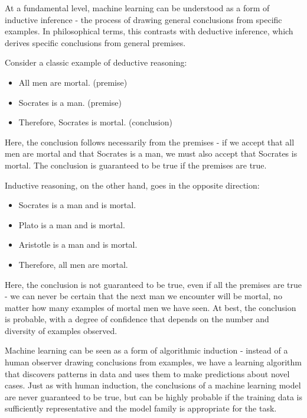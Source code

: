 \documentclass[
  9pt,
  letterpaper,
  abstract,
  titlepage]{scrbook}
\providecommand{\tightlist}{%
  \setlength{\itemsep}{0pt}\setlength{\parskip}{0pt}}\usepackage{longtable,booktabs,array}
\def\tightlist{}
\let\tightlist\relax
\begin{document}
At a fundamental level, machine learning can be understood as a form of
inductive inference - the process of drawing general conclusions from
specific examples. In philosophical terms, this contrasts with deductive
inference, which derives specific conclusions from general premises.

Consider a classic example of deductive reasoning:

\begin{itemize}
\tightlist
\item
  All men are mortal. (premise)
\item
  Socrates is a man. (premise)
\item
  Therefore, Socrates is mortal. (conclusion)
\end{itemize}

Here, the conclusion follows necessarily from the premises - if we
accept that all men are mortal and that Socrates is a man, we must also
accept that Socrates is mortal. The conclusion is guaranteed to be true
if the premises are true.

Inductive reasoning, on the other hand, goes in the opposite direction:

\begin{itemize}
\tightlist
\item
  Socrates is a man and is mortal.
\item
  Plato is a man and is mortal.
\item
  Aristotle is a man and is mortal.
\item
  Therefore, all men are mortal.
\end{itemize}

Here, the conclusion is not guaranteed to be true, even if all the
premises are true - we can never be certain that the next man we
encounter will be mortal, no matter how many examples of mortal men we
have seen. At best, the conclusion is probable, with a degree of
confidence that depends on the number and diversity of examples
observed.

Machine learning can be seen as a form of algorithmic induction -
instead of a human observer drawing conclusions from examples, we have a
learning algorithm that discovers patterns in data and uses them to make
predictions about novel cases. Just as with human induction, the
conclusions of a machine learning model are never guaranteed to be true,
but can be highly probable if the training data is sufficiently
representative and the model family is appropriate for the task.
\end{document}
